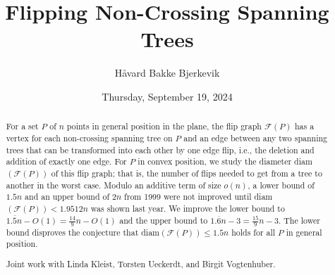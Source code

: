 \documentclass{UAmathtalk}
\author{Håvard Bakke Bjerkevik}
\title{Flipping Non-Crossing Spanning Trees}
\date{Thursday, September 19, 2024}
\begin{document}
\maketitle

\begin{abstract}
For a set $P$ of $n$ points in general position in the plane, the flip graph $\mathcal{F}(P)$ has a vertex for each non-crossing spanning tree on $P$ and an edge between any two spanning trees that can be transformed into each other by one edge flip, i.e., the deletion and addition of exactly one edge. For $P$ in convex position, we study the diameter diam$(\mathcal{F}(P))$ of this flip graph; that is, the number of flips needed to get from a tree to another in the worst case. Modulo an additive term of size $o(n)$, a lower bound of $1.5n$ and an upper bound of $2n$ from 1999 were not improved until diam$(\mathcal{F}(P))<1.9512n$ was shown last year. We improve the lower bound to $1.\overline{5}n - O(1) = \frac{14}{9}n - O(1)$ and the upper bound to $1.\overline{6}n - 3 = \frac{15}{9}n - 3$. The lower bound disproves the conjecture that diam$(\mathcal{F}(P))\leq 1.5n$ holds for all $P$ in general position.

Joint work with Linda Kleist, Torsten Ueckerdt, and Birgit Vogtenhuber.
\end{abstract}
\end{document}
